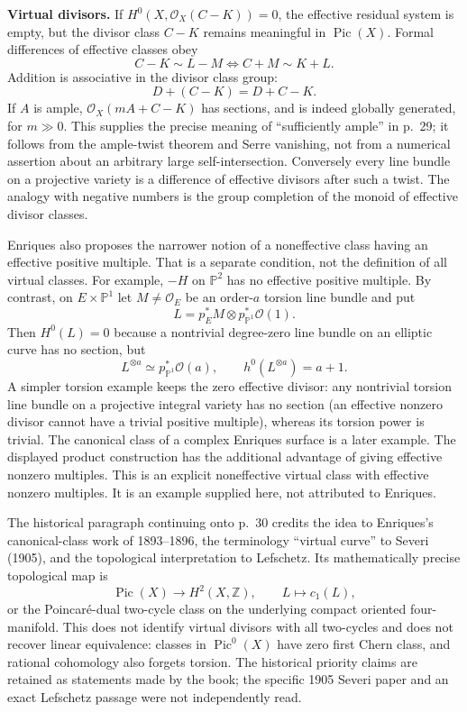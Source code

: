 \textbf{Virtual divisors.} If \(H^0(X,\mathcal O_X(C-K))=0\), the effective residual system is empty, but the divisor class \(C-K\) remains meaningful in \(\operatorname{Pic}(X)\). Formal differences of effective classes obey \[
C-K\sim L-M
\iff C+M\sim K+L.
\] Addition is associative in the divisor class group: \[
D+(C-K)=D+C-K.
\] If \(A\) is ample, \(\mathcal O_X(mA+C-K)\) has sections, and is indeed globally generated, for \(m\gg0\). This supplies the precise meaning of ``sufficiently ample'' in p.~29; it follows from the ample-twist theorem and Serre vanishing, not from a numerical assertion about an arbitrary large self-intersection. Conversely every line bundle on a projective variety is a difference of effective divisors after such a twist. The analogy with negative numbers is the group completion of the monoid of effective divisor classes.

Enriques also proposes the narrower notion of a noneffective class having an effective positive multiple. That is a separate condition, not the definition of all virtual classes. For example, \(-H\) on \(\mathbb P^2\) has no effective positive multiple. By contrast, on \(E\times\mathbb P^1\) let \(M\ne\mathcal O_E\) be an order-\(a\) torsion line bundle and put \[
L=p_E^*M\otimes p_{\mathbb P^1}^*\mathcal O(1).
\] Then \(H^0(L)=0\) because a nontrivial degree-zero line bundle on an elliptic curve has no section, but \[
L^{\otimes a}\simeq p_{\mathbb P^1}^*\mathcal O(a),
\qquad h^0(L^{\otimes a})=a+1.
\] A simpler torsion example keeps the zero effective divisor: any nontrivial torsion line bundle on a projective integral variety has no section (an effective nonzero divisor cannot have a trivial positive multiple), whereas its torsion power is trivial. The canonical class of a complex Enriques surface is a later example. The displayed product construction has the additional advantage of giving effective nonzero multiples. This is an explicit noneffective virtual class with effective nonzero multiples. It is an example supplied here, not attributed to Enriques.

The historical paragraph continuing onto p.~30 credits the idea to Enriques's canonical-class work of 1893--1896, the terminology ``virtual curve'' to Severi (1905), and the topological interpretation to Lefschetz. Its mathematically precise topological map is \[
\operatorname{Pic}(X)\longrightarrow H^2(X,\mathbb Z),
\qquad L\longmapsto c_1(L),
\] or the Poincaré-dual two-cycle class on the underlying compact oriented four-manifold. This does not identify virtual divisors with all two-cycles and does not recover linear equivalence: classes in \(\operatorname{Pic}^0(X)\) have zero first Chern class, and rational cohomology also forgets torsion. The historical priority claims are retained as statements made by the book; the specific 1905 Severi paper and an exact Lefschetz passage were not independently read.

